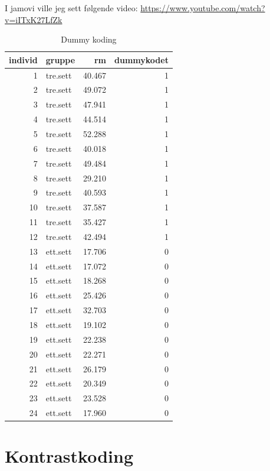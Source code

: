 \documentclass[
]{book}
\begin{document}
I jamovi ville jeg sett følgende video: \url{https://www.youtube.com/watch?v=iITxK27LfZk}

\begin{table}

\caption{\label{tab:unnamed-chunk-4}Dummy koding}
\centering
\begin{tabular}[t]{r|l|r|r}
\hline
individ & gruppe & rm & dummykodet\\
\hline
1 & tre.sett & 40.467 & 1\\
\hline
2 & tre.sett & 49.072 & 1\\
\hline
3 & tre.sett & 47.941 & 1\\
\hline
4 & tre.sett & 44.514 & 1\\
\hline
5 & tre.sett & 52.288 & 1\\
\hline
6 & tre.sett & 40.018 & 1\\
\hline
7 & tre.sett & 49.484 & 1\\
\hline
8 & tre.sett & 29.210 & 1\\
\hline
9 & tre.sett & 40.593 & 1\\
\hline
10 & tre.sett & 37.587 & 1\\
\hline
11 & tre.sett & 35.427 & 1\\
\hline
12 & tre.sett & 42.494 & 1\\
\hline
13 & ett.sett & 17.706 & 0\\
\hline
14 & ett.sett & 17.072 & 0\\
\hline
15 & ett.sett & 18.268 & 0\\
\hline
16 & ett.sett & 25.426 & 0\\
\hline
17 & ett.sett & 32.703 & 0\\
\hline
18 & ett.sett & 19.102 & 0\\
\hline
19 & ett.sett & 22.238 & 0\\
\hline
20 & ett.sett & 22.271 & 0\\
\hline
21 & ett.sett & 26.179 & 0\\
\hline
22 & ett.sett & 20.349 & 0\\
\hline
23 & ett.sett & 23.528 & 0\\
\hline
24 & ett.sett & 17.960 & 0\\
\hline
\end{tabular}
\end{table}

\hypertarget{kontrastkoding-1}{%
\section{Kontrastkoding}\label{kontrastkoding-1}}
\end{document}
